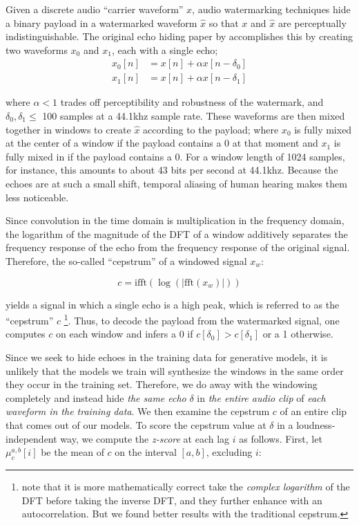 \documentclass[letterpaper]{article} %
\begin{document}
Given a discrete audio ``carrier waveform'' $x$, audio watermarking techniques hide a binary payload in a watermarked waveform $\hat{x}$ so that $x$ and $\hat{x}$ are perceptually indistinguishable.  The original echo hiding paper by \cite{gruhl1996echo} accomplishes this by creating two waveforms $x_0$ and $x_1$, each with a single echo; 
\begin{equation}
    \label{eq:echohidesingle}
    \begin{aligned}
        x_0[n] &= x[n] + \alpha x[n - \delta_0] \\
        x_1[n] &= x[n] + \alpha x[n - \delta_1]
    \end{aligned}
\end{equation}

 where $\alpha < 1$ trades off perceptibility and robustness of the watermark, and $\delta_0, \delta_1 \leq $ 100 samples at a 44.1khz sample rate.  These waveforms are then mixed together in windows to create $\hat{x}$ according to the payload; where $x_0$ is fully mixed at the center of a window if the payload contains a 0 at that moment and $x_1$ is fully mixed in if the payload contains a 0.  For a window length of 1024 samples, for instance, this amounts to about 43 bits per second at 44.1khz.  Because the echoes are at such a small shift, temporal aliasing of human hearing makes them less noticeable.
 
 
Since convolution in the time domain is multiplication in the frequency domain, the logarithm of the magnitude of the DFT of a window additively separates the frequency response of the echo from the frequency response of the original signal.  Therefore, the so-called ``cepstrum'' of a windowed signal $x_w$:
 
\begin{equation}
    \label{eq:cepstrum}
    c = \text{ifft} ( \log ( | \text{fft} (x_w) | ) )
\end{equation}
 
yields a signal in which a single echo is a high peak, which is referred to as the ``cepstrum'' $c$ \footnote{\cite{gruhl1996echo} note that it is more mathematically correct take the {\em complex logarithm} of the DFT before taking the inverse DFT, and they further enhance with an autocorrelation.  But we found better results with the traditional cepstrum.}.  Thus, to decode the payload from the watermarked signal, one computes $c$ on each window and infers a 0 if $c[\delta_0] > c[\delta_1]$ or a 1 otherwise.

Since we seek to hide echoes in the training data for generative models, it is unlikely that the models we train will synthesize the windows in the same order they occur in the training set.  Therefore, we do away with the windowing completely and instead hide {\em the same echo} $\delta$ in {\em the entire audio clip} of {\em each waveform in the training data}.  We then examine the cepstrum $c$ of an entire clip that comes out of our models.  To score the cepstrum value at $\delta$ in a loudness-independent way, we compute the {\em z-score} at each lag $i$ as follows.  First, let $\mu_{c}^{a,b}[i]$ be the mean of $c$ on the interval $[a, b]$, excluding $i$:
\end{document}
